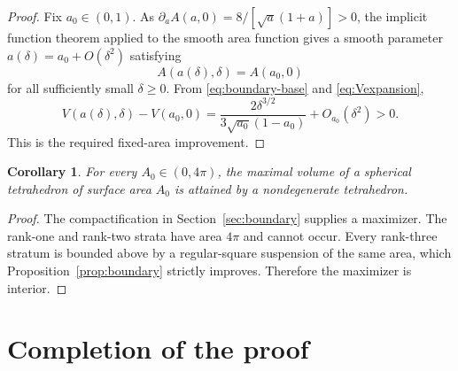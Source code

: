 \documentclass[11pt,reqno]{amsart}
\newtheorem{corollary}[theorem]{Corollary}
\theoremstyle{remark}
\begin{document}
\begin{proof}
Fix $a_0\in(0,1)$. As
$\partial_aA(a,0)=8/[\sqrt a(1+a)]>0$, the implicit function theorem applied to the smooth area function gives a smooth parameter $a(\delta)=a_0+O(\delta^2)$ satisfying
\[
 A(a(\delta),\delta)=A(a_0,0)
\]
for all sufficiently small $\delta\ge0$. From \eqref{eq:boundary-base} and \eqref{eq:Vexpansion},
\begin{equation}\label{eq:gain}
 V(a(\delta),\delta)-V(a_0,0)
 =\frac{2\delta^{3/2}}{3\sqrt{a_0}(1-a_0)}
 +O_{a_0}(\delta^2)>0.
\end{equation}
This is the required fixed-area improvement.
\end{proof}

\begin{corollary}\label{cor:interior}
For every $A_0\in(0,4\pi)$, the maximal volume of a spherical tetrahedron of surface area $A_0$ is attained by a nondegenerate tetrahedron.
\end{corollary}
\begin{proof}
The compactification in Section~\ref{sec:boundary} supplies a maximizer. The rank-one and rank-two strata have area $4\pi$ and cannot occur. Every rank-three stratum is bounded above by a regular-square suspension of the same area, which Proposition~\ref{prop:boundary} strictly improves. Therefore the maximizer is interior.
\end{proof}

\section{Completion of the proof}\label{sec:completion}
\end{document}

